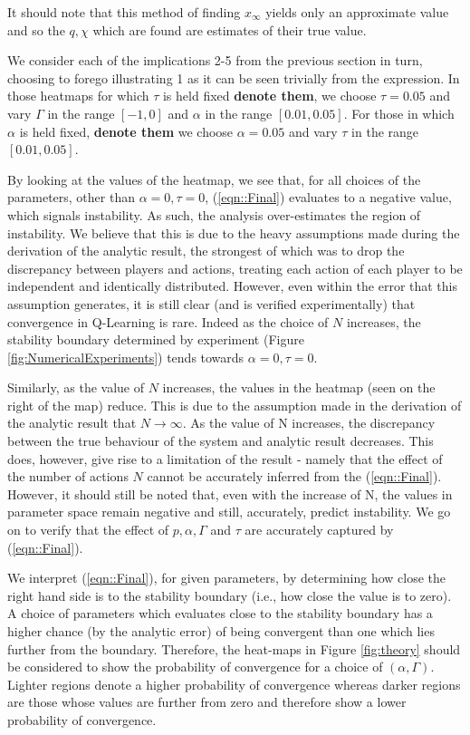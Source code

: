 \documentclass[sigconf,anonymous]{aamas}
\newcommand{\xfixed}{x_\infty}
\begin{document}
It should note that this method of finding $\xfixed$ yields only an approximate value and so the $q, \chi$ which are found are estimates of their true value. 

We consider each of the implications 2-5 from the previous section in turn, choosing to forego illustrating 1 as it can be seen trivially from the expression. In those heatmaps for which $\tau$ is held fixed \textbf{denote them}, we choose $\tau = 0.05 $ and vary $\Gamma$ in the range $[-1, 0]$ and $\alpha$ in the range $[0.01, 0.05]$. For those in which $\alpha$ is held fixed, \textbf{denote them} we choose $\alpha =  0.05$ and vary $\tau$ in the range $[0.01, 0.05]$.

By looking at the values of the heatmap, we see that, for all choices of the parameters, other than $\alpha = 0, \tau = 0$, (\ref{eqn::Final}) evaluates to a negative value, which signals instability. As such, the analysis over-estimates the region of instability. We believe that this is due to the heavy assumptions made during the derivation of the analytic result, the strongest of which was to drop the discrepancy between players and actions, treating each action of each player to be independent and identically distributed. However, even within the error that this assumption generates, it is still clear (and is verified experimentally) that convergence in Q-Learning is rare. Indeed as the choice of $N$ increases, the stability boundary determined by experiment (Figure \ref{fig:NumericalExperiments}) tends towards $\alpha = 0, \tau = 0$. 

Similarly, as the value of $N$ increases, the values in the heatmap (seen on the right of the map) reduce. This is due to the assumption made in the derivation of the analytic result that $N \rightarrow \infty$. As the value of N increases, the discrepancy between the true behaviour of the system and analytic result decreases. This does, however, give rise to a limitation of the result - namely that the effect of the number of actions $N$ cannot be accurately inferred from the (\ref{eqn::Final}). However, it should still be noted that, even with the increase of N, the values in parameter space remain negative and still, accurately, predict instability. We go on to verify that the effect of $p, \alpha, \Gamma$ and $\tau$ are accurately captured by (\ref{eqn::Final}).

We interpret (\ref{eqn::Final}), for given parameters, by determining how close the right hand side is to the stability boundary (i.e., how close the value is to zero). A choice of parameters which evaluates close to the stability boundary has a higher chance (by the analytic error) of being convergent than one which lies further from the boundary. Therefore, the heat-maps in Figure \ref{fig:theory} should be considered to show the probability of convergence for a choice of $(\alpha, \Gamma)$. Lighter regions denote a higher probability of convergence whereas darker regions are those whose values are further from zero and therefore show a lower probability of convergence.
\end{document}
